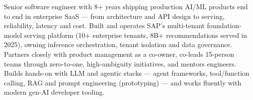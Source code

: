 
\begin{cvparagraph}
Senior software engineer with 8+ years shipping production AI/ML products end to end in enterprise SaaS --- from architecture and API design to serving, reliability, latency and cost. Built and operates SAP's multi-tenant foundation-model serving platform (10+ enterprise tenants, 8B+ recommendations served in 2025), owning inference orchestration, tenant isolation and data governance. Partners closely with product management as a co-owner, co-leads 15-person teams through zero-to-one, high-ambiguity initiatives, and mentors engineers. Builds hands-on with LLM and agentic stacks --- agent frameworks, tool/function calling, RAG and prompt engineering (prototyping) --- and works fluently with modern gen-AI developer tooling.
\end{cvparagraph}
